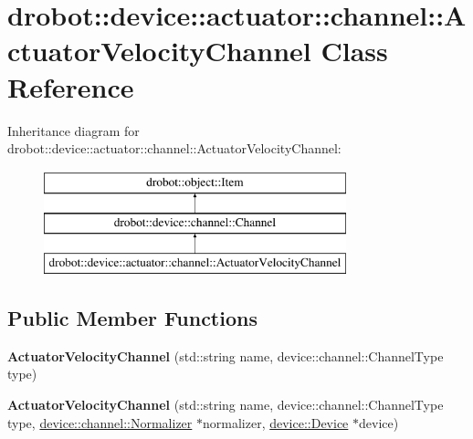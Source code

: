 \hypertarget{classdrobot_1_1device_1_1actuator_1_1channel_1_1ActuatorVelocityChannel}{\section{drobot\-:\-:device\-:\-:actuator\-:\-:channel\-:\-:Actuator\-Velocity\-Channel Class Reference}
\label{classdrobot_1_1device_1_1actuator_1_1channel_1_1ActuatorVelocityChannel}
}
Inheritance diagram for drobot\-:\-:device\-:\-:actuator\-:\-:channel\-:\-:Actuator\-Velocity\-Channel\-:\begin{figure}[H]
\begin{center}
\leavevmode
\includegraphics[height=3.000000cm]{classdrobot_1_1device_1_1actuator_1_1channel_1_1ActuatorVelocityChannel}
\end{center}
\end{figure}
\subsection*{Public Member Functions}
\begin{DoxyCompactItemize}
\item 
\hypertarget{classdrobot_1_1device_1_1actuator_1_1channel_1_1ActuatorVelocityChannel_ada31c8c19a9238563476adc37e2c515d}{{\bfseries Actuator\-Velocity\-Channel} (std\-::string name, device\-::channel\-::\-Channel\-Type type)}\label{classdrobot_1_1device_1_1actuator_1_1channel_1_1ActuatorVelocityChannel_ada31c8c19a9238563476adc37e2c515d}

\item 
\hypertarget{classdrobot_1_1device_1_1actuator_1_1channel_1_1ActuatorVelocityChannel_a961996b980471228a30b19136b8f43e1}{{\bfseries Actuator\-Velocity\-Channel} (std\-::string name, device\-::channel\-::\-Channel\-Type type, \hyperlink{classdrobot_1_1device_1_1channel_1_1Normalizer}{device\-::channel\-::\-Normalizer} $\ast$normalizer, \hyperlink{classdrobot_1_1device_1_1Device}{device\-::\-Device} $\ast$device)}\label{classdrobot_1_1device_1_1actuator_1_1channel_1_1ActuatorVelocityChannel_a961996b980471228a30b19136b8f43e1}

\end{DoxyCompactItemize}
